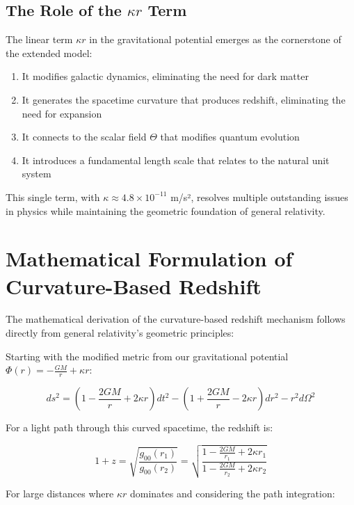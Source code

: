 \documentclass[12pt,a4paper]{article}
\begin{document}
	\subsection{The Role of the $\kappa r$ Term}
	
	The linear term $\kappa r$ in the gravitational potential emerges as the cornerstone of the extended model:
	
	\begin{enumerate}
		\item It modifies galactic dynamics, eliminating the need for dark matter
		\item It generates the spacetime curvature that produces redshift, eliminating the need for expansion
		\item It connects to the scalar field $\Theta$ that modifies quantum evolution
		\item It introduces a fundamental length scale that relates to the natural unit system
	\end{enumerate}
	
	This single term, with $\kappa \approx 4.8\times10^{-11}$ m/s², resolves multiple outstanding issues in physics while maintaining the geometric foundation of general relativity.
	
	\section{Mathematical Formulation of Curvature-Based Redshift}
	
	The mathematical derivation of the curvature-based redshift mechanism follows directly from general relativity's geometric principles:
	
	Starting with the modified metric from our gravitational potential $\Phi(r) = -\frac{GM}{r} + \kappa r$:
	
	\begin{equation}
		ds^2 = (1 - \frac{2GM}{r} + 2\kappa r)dt^2 - (1 + \frac{2GM}{r} - 2\kappa r)dr^2 - r^2d\Omega^2
	\end{equation}
	
	For a light path through this curved spacetime, the redshift is:
	
	\begin{equation}
		1 + z = \sqrt{\frac{g_{00}(r_1)}{g_{00}(r_2)}} = \sqrt{\frac{1 - \frac{2GM}{r_1} + 2\kappa r_1}{1 - \frac{2GM}{r_2} + 2\kappa r_2}}
	\end{equation}
	
	For large distances where $\kappa r$ dominates and considering the path integration:
	
\end{document}
